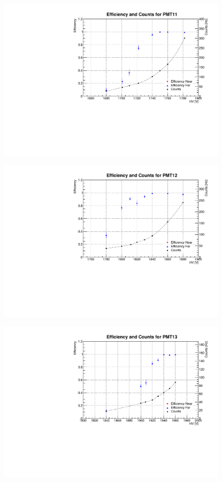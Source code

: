 \begin{figure}[h]
	\centerline{\includegraphics[scale=0.8]{img/eff11.pdf}}
\end{figure}
\begin{figure}[h]
	\centerline{\includegraphics[scale=0.8]{img/eff12.pdf}}
\end{figure}
\begin{figure}[h]
	\centerline{\includegraphics[scale=0.8]{img/eff13.pdf}}
\end{figure}
